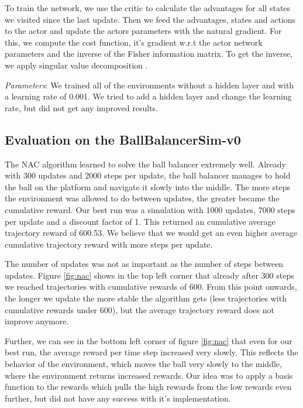 To train the network, we use the critic to calculate the advantages for all states we visited since the last update. Then we feed the advantages, states and actions to the actor and update the actors parameters with the natural gradient. For this, we compute the cost function, it's gradient w.r.t the actor network parameters and the inverse of the Fisher information matrix. To get the inverse, we apply singular value decomposition \citep{golub1965calculating}.

\textit{Parameters}: We trained all of the environments without a hidden layer and with a learning rate of 0.001. We tried to add a hidden layer and change the learning rate, but did not get any improved results.

\subsection{Evaluation on the BallBalancerSim-v0}

The NAC algorithm learned to solve the ball balancer extremely well. Already with 300 updates and 2000 steps per update, the ball balancer manages to hold the ball on the platform and navigate it slowly into the middle. The more steps the environment was allowed to do between updates, the greater became the cumulative reward. Our best run was a simulation with 1000 updates, 7000 steps per update and a discount factor of 1. This returned an cumulative average trajectory reward of 600.53. We believe that we would get an even higher average cumulative trajectory reward with more steps per update. 

The number of updates was not as important as the number of steps between updates. Figure \ref{fig:nac} shows in the top left corner that already after 300 steps we reached trajectories with cumulative rewards of 600. From this point onwards, the longer we update the more stable the algorithm gets (less trajectories with cumulative rewards under 600), but the average trajectory reward does not improve anymore.

Further, we can see in the bottom left corner of figure \ref{fig:nac} that even for our best run, the average reward per time step increased very slowly. This reflects the behavior of the environment, which moves the ball very slowly to the middle, where the environment returns increased rewards. Our idea was to apply a basis function to the rewards which pulls the high rewards from the low rewards even further, but did not have any success with it's implementation.

